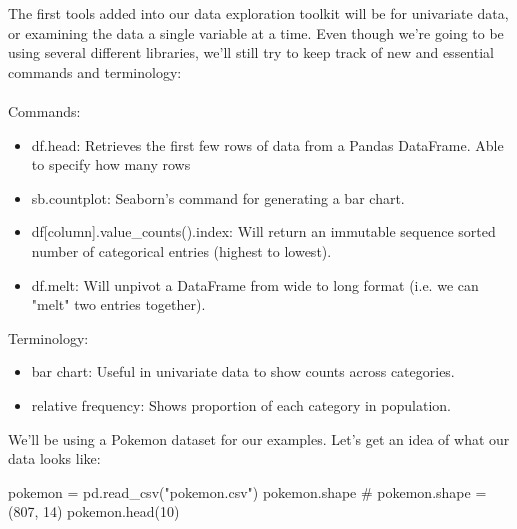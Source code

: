 The first tools added into our data exploration toolkit will be for univariate data, or examining the data a single variable at a time. Even though we're going to be using several different libraries, we'll still try to keep track of new and essential commands and terminology:
\\\\

Commands:
\begin{itemize}
	\item df.head: Retrieves the first few rows of data from a Pandas DataFrame. Able to specify how many rows
	\item sb.countplot: Seaborn's command for generating a bar chart.
	\item df[column].value\_counts().index: Will return an immutable sequence sorted number of categorical entries (highest to lowest).
	\item df.melt: Will unpivot a DataFrame from wide to long format (i.e. we can "melt" two entries together).
\end{itemize}

Terminology:
\begin{itemize}
	\item bar chart: Useful in univariate data to show counts across categories.
	\item relative frequency: Shows proportion of each category in population.
\end{itemize}

We'll be using a Pokemon dataset for our examples. Let's get an idea of what our data looks like:

\begin{python}
	pokemon = pd.read_csv("pokemon.csv")
	pokemon.shape
	# pokemon.shape = (807, 14)
	pokemon.head(10)
\end{python}


